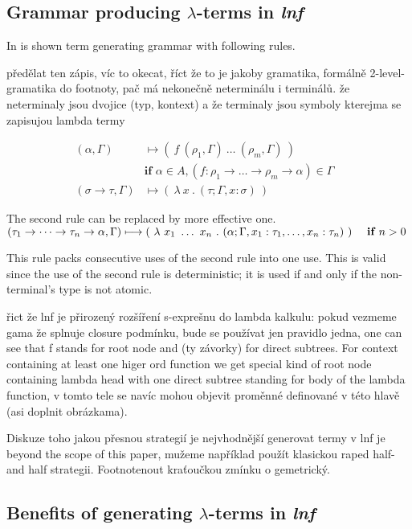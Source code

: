 \documentclass{sig-alternate}
\newcommand{\lterms}{$\lambda$-terms\xspace}
\newcommand{\lnf}{\textit{lnf}\xspace}
\newcommand{\ar}{\rightarrow\xspace}
\newcommand{\gar}{\longmapsto}
\newcommand{\red}[1]{{\color{red} #1}}
\begin{document}
\subsection{Grammar producing \lterms in \lnf}

In \cite{barendregt10} is shown term generating grammar with 
following rules.

\red{předělat ten zápis, víc to okecat, říct že to je jakoby gramatika, 
formálně 2-level-gramatika do footnoty, pač má nekonečně neterminálu  
i terminálů. že neterminaly jsou dvojice (typ, kontext) a že terminaly jsou
symboly kterejma se zapisujou lambda termy}

\begin{align*}
( \alpha , \Gamma )  
&\gar
(~f~( \rho_1 , \Gamma )~\dots~( \rho_m , \Gamma )~)
\\& \textbf{if } \alpha \in A,
(f : \rho_1 \ar \dots \ar \rho_m \ar \alpha) \in \Gamma
\\ 
( \sigma \rightarrow \tau , \Gamma )  
&\gar
(~\lambda~x~.~( \tau ; \Gamma,x:\sigma )~)
&   
\end{align*}

The second rule can be replaced by more effective one.
$ 
( \tau_1 \ar \dots \ar \tau_n \ar \alpha , \Gamma )  
\gar \\
(~\lambda~x_1~\dots~x_n~.~
( \alpha ; \Gamma , x_1:\tau_1 , \dots , x_n:\tau_n  )~)
~~~~ \textbf{if } n > 0
$ 

This rule packs consecutive uses of the second rule into one use.
This is valid since the use of the second rule is deterministic;
it is used if and only if the non-terminal's type is not atomic.

\red{řict že lnf je přirozený rozšíření s-exprešnu do lambda 
kalkulu: pokud vezmeme gama že splnuje closure podmínku, bude 
se používat jen pravidlo jedna, one can see that f stands for 
root node and (ty závorky) for direct subtrees. For context containing 
at least one higer ord function we get special kind of root node containing
lambda head with one direct subtree standing for body of 
the lambda function, v tomto tele se navíc mohou objevit proměnné 
definované v této hlavě (asi doplnit obrázkama).

Diskuze toho jakou přesnou strategií je nejvhodnější generovat
termy v lnf je beyond the scope of this paper, mužeme například použít
klasickou raped half-and half strategii. Footnotenout kraťoučkou
zmínku o gemetrický. 
}


\subsection{Benefits of generating \lterms in \lnf}
\label{benefits}
\end{document}
